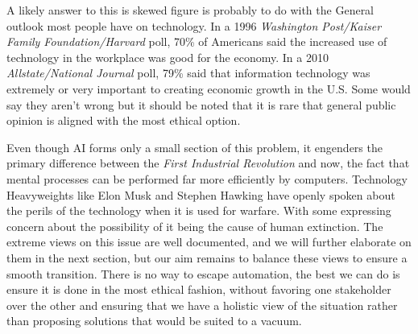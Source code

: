A likely answer to this is skewed figure is probably to do with the General outlook most people have on technology. In a 1996 \textit{Washington Post/Kaiser Family Foundation/Harvard} poll, 70\% of Americans said the increased use of technology in the workplace was good for the economy. In a 2010 \textit{Allstate/National Journal} poll, 79\% said that information technology was extremely or very important to creating economic growth in the U.S. Some would say they aren't wrong but it should be noted that it is rare that general public opinion is aligned with the most ethical option.

Even though AI forms only a small section of this problem, it engenders the primary difference between the \textit{First Industrial Revolution} and now, the fact that mental processes can be performed far more efficiently by computers. Technology Heavyweights like Elon Musk and Stephen Hawking have openly spoken about the perils of the technology when it is used for warfare\cite{aidangers}. With some expressing concern about the possibility of it being the cause of human extinction. The extreme views on this issue are well documented, and we will further elaborate on them in the next section, but our aim remains to balance these views to ensure a smooth transition. There is no way to escape automation, the best we can do is ensure it is done in the most ethical fashion, without favoring one stakeholder over the other and ensuring that we have a holistic view of the situation rather than proposing solutions that would be suited to a vacuum.

